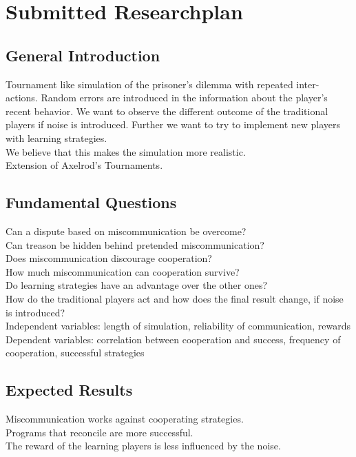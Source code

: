 \section{Submitted Researchplan}
\subsection{General Introduction}
Tournament like simulation of the prisoner's dilemma with repeated inter-
actions. Random errors are introduced in the information about the player's 
recent behavior. We want to observe the different outcome of the traditional
players if noise is introduced. Further we want to try to implement new 
players with learning strategies. \\

We believe that this makes the simulation more realistic.\\

Extension of Axelrod's Tournaments.

\subsection{Fundamental Questions}
Can a dispute based on miscommunication be overcome?\\
Can treason be hidden behind pretended miscommunication?\\
Does miscommunication discourage cooperation?\\
How much miscommunication can cooperation survive?\\
Do learning strategies have an advantage over the other ones?\\
How do the traditional players act and how does the final result change, 
if noise is introduced?\\
Independent variables: length of simulation, reliability of communication, rewards\\
Dependent variables: correlation between cooperation and success, frequency of cooperation, successful strategies

\subsection{Expected Results}
Miscommunication works against cooperating strategies.\\ 
Programs that reconcile are more successful.\\
The reward of the learning players is less influenced by the noise.

